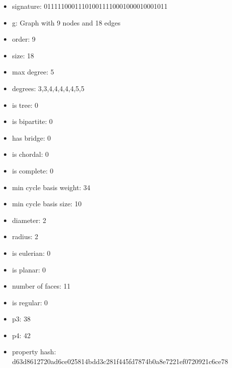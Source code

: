 \newpage
\begin{figure}
\end{figure}
\begin{itemize}
\item signature: 011111000111010011110001000010001011
\item g: Graph with 9 nodes and 18 edges
\item order: 9
\item size: 18
\item max degree: 5
\item degrees: 3,3,4,4,4,4,4,5,5
\item is tree: 0
\item is bipartite: 0
\item has bridge: 0
\item is chordal: 0
\item is complete: 0
\item min cycle basis weight: 34
\item min cycle basis size: 10
\item diameter: 2
\item radius: 2
\item is eulerian: 0
\item is planar: 0
\item number of faces: 11
\item is regular: 0
\item p3: 38
\item p4: 42
\item property hash: d63d8612720ad6ce025814bdd3c281f445fd7874b0a8e7221ef0720921c6ce78
\end{itemize}
